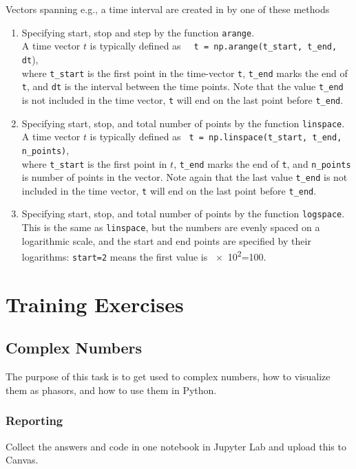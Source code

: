 Vectors spanning e.g., a time interval are created in \numpy by one of these methods

\begin{enumerate}[1)]
	\item Specifying start, stop and step by the function \texttt{arange}. \\ 
	 A time vector $t$ is  typically defined as 
	 \verb|  t = np.arange(t_start, t_end, dt|), \\
	 where \verb|t_start| is the first point in the time-vector \verb|t|, \verb|t_end| marks the end of \verb|t|, and \verb|dt| is the interval between the time points. Note that the value \verb|t_end| is not included in the time vector, \verb|t| will end on the last point before \verb|t_end|.
	 
	\item Specifying start, stop, and total number of points by the function \texttt{linspace}. \\
	A time vector $t$ is typically defined as \verb| t = np.linspace(t_start, t_end, n_points)|, \\
	where \verb|t_start| is the first point in $t$, \verb|t_end| marks the end of \verb|t|, and \verb|n_points| is number of points in the vector. 
	Note again that the last value \verb|t_end| is not included in the time vector, \verb|t| will end on the last point before \verb|t_end|.

	\item Specifying start, stop, and total number of points by the function \texttt{logspace}. \\ 
	This is the same as \verb|linspace|, but the numbers are evenly spaced on a logarithmic scale, and the start and end points are specified by their logarithms: \verb|start=2| means the first value is \num{e2}=\num{100}.
\end{enumerate}
	


\section{Training Exercises}

\subsection{Complex Numbers}
The purpose of this task is to get used to complex numbers, how to visualize them as phasors, and how to use them in Python.

\subsubsection*{Reporting}	
Collect the answers and code in one notebook in Jupyter Lab and upload this to Canvas.

